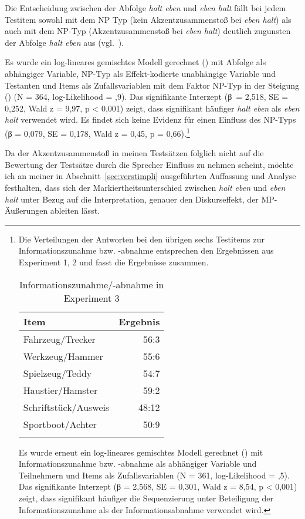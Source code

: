 Die Entscheidung zwischen der Abfolge \textit{halt eben} und \textit{eben halt} fällt bei jedem Testitem sowohl mit dem NP Typ  (kein Akzentzusammenstoß bei \textit{eben halt}) als auch mit dem NP-Typ   (Akzentzusammenstoß bei \textit{eben halt}) deutlich zugunsten der Abfolge \textit{halt eben} aus (vgl.\ ).

Es wurde ein log-lineares gemischtes Modell gerechnet (\citealt{Baayen2008}) mit Abfolge als abhängiger Variable, NP-Typ als Effekt-kodierte unabhängige Variable und Testanten und Items als Zufallsvariablen mit dem Faktor NP-Typ in der Steigung (\citealt{Barr2013}) (N = 364, log-Like\-li\-hood = ,9). Das signifikante Interzept (\mbox{β =} 2,518, SE = 0,252, Wald z = 9,97, p < 0,001) zeigt, dass signifikant häufiger \textit{halt eben} als \textit{eben halt} verwendet wird. Es findet sich keine Evidenz für einen Einfluss des NP-Typs (β = 0,079, SE = 0,178, Wald z = 0,45, p = 0,66).\footnote{Die Verteilungen der Antworten bei den übrigen sechs Testitems zur Informationszunahme bzw. -abnahme entsprechen den Ergebnissen aus Experiment 1, 2 und  fasst die Ergebnisse zusammen.
\begin{table}[H]
	\caption{\label{tab:692}Informationszunahme/-abnahme in Experiment 3}
	\begin{tabular}{lr}
	\lsptoprule
	Item & Ergebnis\\
	\midrule
	Fahrzeug/Trecker & 56:3\\
	Werkzeug/Hammer & 55:6\\
	Spielzeug/Teddy & 54:7\\
	Haustier/Hamster & 59:2\\
	Schriftstück/Ausweis & 48:12\\
	Sportboot/Achter & 50:9\\
      \lspbottomrule
    \end{tabular}
\end{table}
Es wurde erneut ein log-lineares gemischtes Modell gerechnet (\citealt{Baayen2008}) mit Informationszunahme bzw. -abnahme als abhängiger Variable und Teilnehmern und Items als Zufallsvariablen (N = 361, log-Like\-li\-hood = ,5). Das signifikante Interzept (β = 2,568, SE = 0,301, Wald z = 8,54, p < 0,001) zeigt, dass signifikant häufiger die Sequenzierung unter Beteiligung der Informationszunahme als der Informationsabnahme verwendet wird.}\largerpage[2]

Da der Akzentzusammenstoß in meinen Testsätzen folglich nicht auf die Bewertung der Testsätze durch die Sprecher Einfluss zu nehmen scheint, möchte ich an meiner in Abschnitt~\ref{sec:verstimpli} ausgeführten Auffassung und Analyse festhalten, dass sich der Markiertheitsunterschied zwischen \textit{halt eben} und \textit{eben halt} unter Bezug auf die Interpretation, genauer den Diskurseffekt, der MP-Äußerungen ableiten lässt. 

